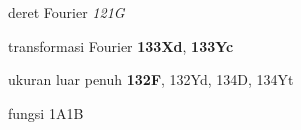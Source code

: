 



deret Fourier {\it 121G}



transformasi Fourier {\bf 133Xd}, {\bf 133Yc}



























































ukuran luar penuh {\bf 132F}, 132Yd, 134D, 134Yt











fungsi 1A1B








\indexmedskip














